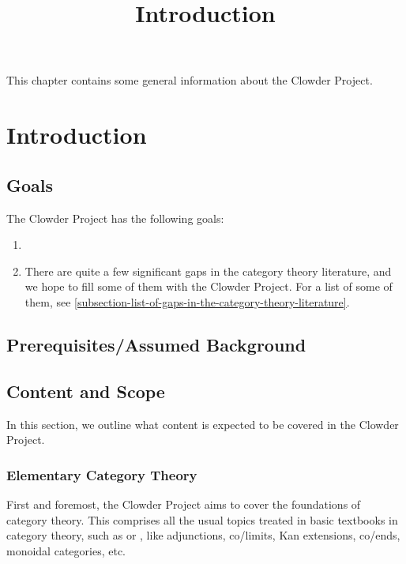 

%



\title{Introduction}

\maketitle

\label{section-phantom}

This chapter contains some general information about the Clowder Project.

\ChapterTableOfContents

\section{Introduction}\label{section-introduction}
\subsection{Goals}\label{subsection-goals}
The Clowder Project has the following goals:
\begin{enumerate}
    \item\label{subsection-goals-item-1}
    \item\label{subsection-goals-item-2}There are quite a few significant gaps in the category theory literature, and we hope to fill some of them with the Clowder Project. For a list of some of them, see \cref{subsection-list-of-gaps-in-the-category-theory-literature}.
\end{enumerate}
\subsection{Prerequisites/Assumed Background}\label{subsection-prerequisites-assumed-background}
\subsection{Content and Scope}\label{subsection-scope}
In this section, we outline what content is expected to be covered in the Clowder Project.
\subsubsection{Elementary Category Theory}\label{subsubsection-elementary-category-theory}
First and foremost, the Clowder Project aims to cover the foundations of category theory. This comprises all the usual topics treated in basic textbooks in category theory, such as \cite{categories-for-the-working-mathematician} or \cite{category-theory-in-context}, like adjunctions, co/limits, Kan extensions, co/ends, monoidal categories, etc.
